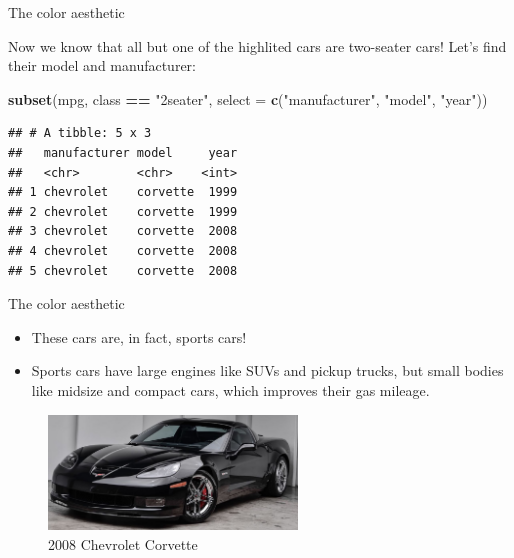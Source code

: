 \documentclass[ignorenonframetext,]{beamer}
\newenvironment{Shaded}{\begin{snugshade}}{\end{snugshade}}
\newcommand{\DataTypeTok}[1]{\textcolor[rgb]{0.13,0.29,0.53}{#1}}
\newcommand{\KeywordTok}[1]{\textcolor[rgb]{0.13,0.29,0.53}{\textbf{#1}}}
\newcommand{\NormalTok}[1]{#1}
\newcommand{\OperatorTok}[1]{\textcolor[rgb]{0.81,0.36,0.00}{\textbf{#1}}}
\newcommand{\StringTok}[1]{\textcolor[rgb]{0.31,0.60,0.02}{#1}}
\begin{document}
\begin{frame}[fragile]{The color aesthetic}
\protect\hypertarget{the-color-aesthetic-2}{}

Now we know that all but one of the highlited cars are two-seater cars!
Let's find their model and manufacturer:

\begin{Shaded}
\begin{Highlighting}[]
\KeywordTok{subset}\NormalTok{(mpg, class }\OperatorTok{==}\StringTok{ "2seater"}\NormalTok{, }
       \DataTypeTok{select =} \KeywordTok{c}\NormalTok{(}\StringTok{"manufacturer"}\NormalTok{, }\StringTok{"model"}\NormalTok{, }\StringTok{"year"}\NormalTok{))}
\end{Highlighting}
\end{Shaded}

\begin{verbatim}
## # A tibble: 5 x 3
##   manufacturer model     year
##   <chr>        <chr>    <int>
## 1 chevrolet    corvette  1999
## 2 chevrolet    corvette  1999
## 3 chevrolet    corvette  2008
## 4 chevrolet    corvette  2008
## 5 chevrolet    corvette  2008
\end{verbatim}

\end{frame}

\begin{frame}{The color aesthetic}
\protect\hypertarget{the-color-aesthetic-3}{}

\begin{itemize}
\item
  These cars are, in fact, sports cars!
\item
  Sports cars have large engines like SUVs and pickup trucks, but small
  bodies like midsize and compact cars, which improves their gas
  mileage.
\end{itemize}

\begin{figure}
\centering
\includegraphics[width=2.60417in,height=\textheight]{cc.jpg}
\caption{2008 Chevrolet Corvette}
\end{figure}

\end{frame}
\end{document}
